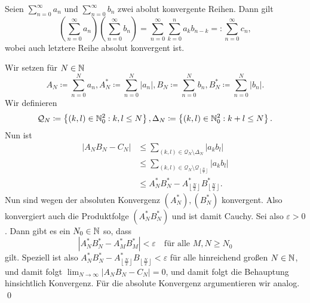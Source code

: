 \begin{subtheorem}
	Seien $ \sum_{n=0}^{\infty} a_n $ und $ \sum_{n=0}^{\infty} b_n $ zwei abolut konvergente Reihen. Dann gilt
	\[
		\left( \sum_{n=0}^{\infty} a_n \right) \left( \sum_{n=0}^{\infty} b_n \right) = \sum_{n=0}^{\infty} \sum_{k=0}^{n} a_kb_{n-k} =: \sum_{n=0}^{\infty} c_n,
	\]
	wobei auch letztere Reihe absolut konvergent ist.
\end{subtheorem}
\begin{subproof*}
	Wir setzen für $ N \in \mathbb{N}  $ 
	\[
		A_N \coloneqq \sum_{n=0}^{N} a_n, A_N^* \coloneqq \sum_{n=0}^{N} \left| a_n \right|, B_N \coloneqq \sum_{n=0}^{N} b_n, B_N^* \coloneqq \sum_{n=0}^{N} \left| b_n \right| .
	\]
	Wir definieren
	\[
		\mathcal{Q}_N \coloneqq  \left\{ (k, l) \in \mathbb{N}_0^2: k, l \leq N \right\} , \Delta_N \coloneqq \left\{ (k,l) \in \mathbb{N}_0^2: k + l \leq N \right\} .
	\]
	Nun ist
	\begin{align*}
		\left| A_NB_N - C_N \right| &\leq \sum_{(k, l) \in \mathcal{Q}_N\setminus \Delta_N} \left| a_kb_l \right| \\
		~&\leq \sum_{(k, l) \in \mathcal{Q}_N\setminus \mathcal{Q}_{\left\lfloor \frac{ N }{ 2 }  \right\rfloor} } \left| a_kb_l \right| \\
		~&\leq A_N^*B_N^* - A_{\left\lfloor \frac{ N }{ 2 }  \right\rfloor}^*B_{\left\lfloor \frac{ N }{ 2 }  \right\rfloor}^*.
	\end{align*}
	Nun sind wegen der absoluten Konvergenz $ \left( A_N^* \right), \left( B_N^* \right) $ konvergent. Also konvergiert auch die Produktfolge $ \left( A_N^*B_N^* \right) $ und ist damit Cauchy. Sei also $ \varepsilon > 0 $. Dann gibt es ein $ N_0 \in \mathbb{N}  $ so, dass
	\[
		\left| A_N^*B_N^* - A_M^*B_M^* \right| < \varepsilon \quad \text{für alle } M, N \geq N_0
	\]
	gilt.
	Speziell ist also $ A_N^*B_N^* - A_{\left\lfloor \frac{ N }{ 2 }  \right\rfloor}^*B_{\left\lfloor \frac{ N }{ 2 }  \right\rfloor} < \varepsilon $ für alle hinreichend großen $ N \in \mathbb{N}  $, und damit folgt $ \lim_{N \to \infty} \left| A_NB_N - C_N \right| = 0 $, und damit folgt die Behauptung hinsichtlich Konvergenz. Für die absolute Konvergenz argumentieren wir analog. \qed
\end{subproof*}

